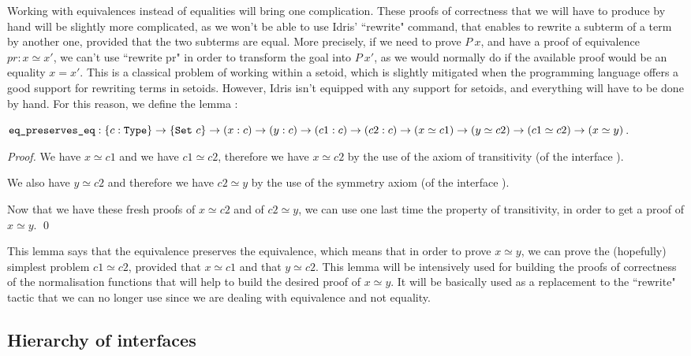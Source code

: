 Working with equivalences instead of equalities will bring one complication. These proofs of correctness that we will have to produce by hand will be slightly more complicated, as we won't be able to use Idris' ``rewrite" command, that enables to rewrite a subterm of a term by another one, provided that the two subterms are equal. More precisely, if we need to prove $P\ x$, and have a proof of equivalence $pr:x \simeq x'$, we can't use ``rewrite pr" in order to transform the goal into $P\ x'$, as we would normally do if the available proof would be an equality $x=x'$. This is a classical problem of working within a setoid, which is slightly mitigated when the programming language offers a good support for rewriting terms in setoids. However, Idris isn't equipped with any support for setoids, and everything will have to be done by hand. For this reason, we define the lemma :

${\mbox{\texttt{eq\_preserves\_eq}}} : \{c:{\mbox{\texttt{Type}}}\} \rightarrow \{{\mbox{\texttt{Set}}}\ c\} \rightarrow (x:c) \rightarrow (y:c) \rightarrow (c1:c) \rightarrow (c2:c) \rightarrow (x \simeq c1) \rightarrow (y \simeq c2) \rightarrow (c1 \simeq c2) \rightarrow (x \simeq y)$.

\begin{proof}
We have $x \simeq c1$ and we have $c1 \simeq c2$, therefore we have $x \simeq c2$ by the use of the axiom of transitivity (of the interface ). \

We also have $y \simeq c2$ and therefore we have $c2 \simeq y$ by the use of the symmetry axiom (of the interface ). \

Now that we have these fresh proofs of $x \simeq c2$ and of $c2 \simeq y$, we can use one last time the property of transitivity, in order to get a proof of $x \simeq y$.
\qed
\end{proof}

This lemma says that the equivalence preserves the equivalence, which means that in order to prove $x \simeq y$, we can prove the (hopefully) simplest problem $c1 \simeq c2$, provided that $x \simeq c1$ and that $y \simeq c2$. This lemma will be intensively used for building the proofs of correctness of the normalisation functions that will help to build the desired proof of $x \simeq y$. It will be basically used as a replacement to the ``rewrite" tactic that we can no longer use since we are dealing with equivalence and not equality.

		\subsection{Hierarchy of interfaces}

